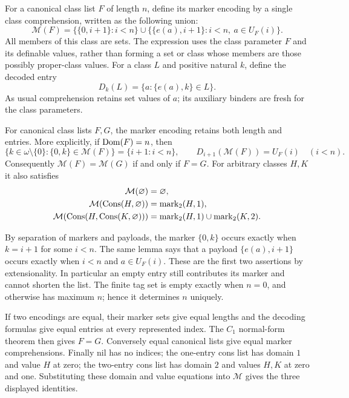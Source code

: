 For a canonical class list $F$ of length $n$, define its marker encoding
by a single class comprehension, written as the following union:
\[
\mathcal M(F)=\{\{0,i+1\}:i<n\}
 \cup\{\{e(a),i+1\}:i<n,\ a\in U_F(i)\}.
\]
All members of this class are sets. The expression uses the class
parameter $F$ and its definable values, rather than forming a set or
class whose members are those possibly proper-class values.
For a class $L$ and positive natural $k$, define the decoded entry
\[
D_k(L)=\{a:\{e(a),k\}\in L\}.
\]
As usual comprehension retains set values of $a$; its auxiliary binders
are fresh for the class parameters.

\begin{theorem}
For canonical class lists $F,G$, the marker encoding retains both
length and entries. More explicitly, if $\mathrm{Dom}(F)=n$, then
\[
\{k\in\omega\setminus\{0\}:\{0,k\}\in\mathcal M(F)\}
 =\{i+1:i<n\},
\qquad D_{i+1}(\mathcal M(F))=U_F(i)\quad(i<n).
\]
Consequently $\mathcal M(F)=\mathcal M(G)$ if and only if $F=G$.
For arbitrary classes $H,K$ it also satisfies
\[
\begin{aligned}
\mathcal M(\varnothing)&=\varnothing,\\
\mathcal M(\operatorname{Cons}(H,\varnothing))
 &=\operatorname{mark}_2(H,1),\\
\mathcal M(\operatorname{Cons}(H,\operatorname{Cons}(K,\varnothing)))
 &=\operatorname{mark}_2(H,1)\cup\operatorname{mark}_2(K,2).
\end{aligned}
\]
\end{theorem}
\Proof
By separation of markers and payloads, the marker $\{0,k\}$ occurs
exactly when $k=i+1$ for some $i<n$. The same lemma says that a
payload $\{e(a),i+1\}$ occurs exactly when $i<n$ and $a\in U_F(i)$.
These are the first two assertions by extensionality. In particular an
empty entry still contributes its marker and cannot shorten the list.
The finite tag set is empty exactly when $n=0$, and otherwise has
maximum $n$; hence it determines $n$ uniquely.

If two encodings are equal, their marker sets give equal lengths and
the decoding formulas give equal entries at every represented index.
The $C_1$ normal-form theorem then gives $F=G$. Conversely equal
canonical lists give equal marker comprehensions. Finally nil has no
indices; the one-entry cons list has domain $1$ and value $H$ at zero;
the two-entry cons list has domain $2$ and values $H,K$ at zero and
one. Substituting these domain and value equations into $\mathcal M$
gives the three displayed identities.
\Done

